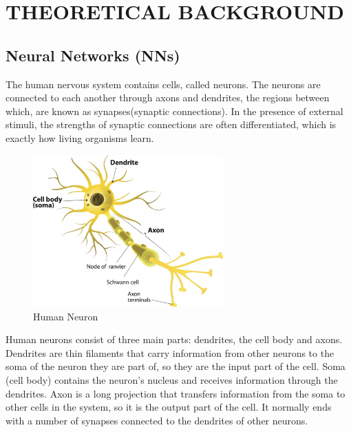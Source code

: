 \chapter{THEORETICAL BACKGROUND} \label{chapter:theoretical_backgroundpape}
    \section{Neural Networks (NNs)} \label{sec:nn}
    The human nervous system contains cells, called neurons. The neurons are connected to each another through axons and dendrites, the regions between which, are known as synapses(synaptic connections). In the presence of external stimuli, the strengths of synaptic connections are often differentiated, which is exactly how living organisms learn. 

      \begin{figure}[h]
        \centering
        \includegraphics[width=0.65\textwidth]{media/neuron-diagram.jpg}
        \caption{Human Neuron}
        \label{fig:humanNeuron}
    \end{figure}

    
    Human neurons consist of three main parts: dendrites, the cell body and axons. Dendrites are thin filaments that carry information from other neurons to the soma of the neuron they are part of, so they are the input part of the cell. Soma (cell body) contains the neuron's nucleus and receives information through the dendrites. Axon is a long projection that transfers information from the soma to other cells in the system, so it is the output part of the cell. It normally ends with a number of synapses connected to the dendrites of other neurons.


